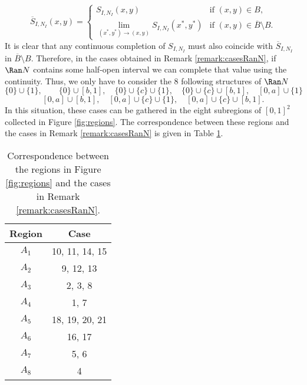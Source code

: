 $$
\overline{S}_{I,N_I}(x,y) =
\left\{ \begin{array}{ll}
	S_{I,N_I}(x,y) &   \text{if }   (x,y) \in B, \\
	\displaystyle \lim_{(x^*,y^*) \to (x,y)} S_{I,N_I}(x^*,y^*) &   \text{if }   (x,y) \in \overline{B} \setminus B.
\end{array} \right.
$$
It is clear that any continuous completion of $S_{I,N_I}$ must also coincide with $\overline{S}_{I,N_I}$ in $\overline{B} \setminus B$.
Therefore, in the cases obtained in Remark \ref{remark:casesRanN}, if $\Ran N$ contains some half-open interval we can complete that value using the continuity. Thus, we only have to consider the 8 following structures of  $\Ran N$
$$\{0\} \cup \{1\}, \quad \quad \{0\} \cup [b,1], \quad \{0\} \cup \{c\} \cup \{1\}, \quad \{0\} \cup \{c\} \cup [b,1], \quad [0,a] \cup \{1\}$$
$$[0,a] \cup [b,1], \quad [0,a] \cup \{c\} \cup \{1\}, \quad [0,a] \cup \{c\} \cup [b,1].$$
In this situation, these cases can be gathered in the eight subregions of $[0,1]^2$ collected in Figure \ref{fig:regions}. The correspondence between these regions and the cases in Remark \ref{remark:casesRanN} is given in Table \ref{table:correspondence_figures}.

\begin{table}[H]
	\centering
	\begin{tabular}{|c|c|}
		\hline
		\textbf{Region} & \textbf{Case} \\ \hline
		\textbf{$A_1$}     & 10, 11, 14, 15   \\ \hline
		\textbf{$A_2$}     & 9, 12, 13 \\ \hline
		\textbf{$A_3$}     & 2, 3, 8 \\ \hline
		\textbf{$A_4$}     & 1, 7 \\ \hline
		\textbf{$A_5$}     & 18, 19, 20, 21 \\ \hline
		\textbf{$A_6$}     & 16, 17 \\ \hline
		\textbf{$A_7$}     & 5, 6\\ \hline
		\textbf{$A_8$}     & 4 \\ \hline
	\end{tabular}
	\caption{Correspondence between the regions in Figure \ref{fig:regions} and the cases in Remark \ref{remark:casesRanN}.}
	\label{table:correspondence_figures}
\end{table}

